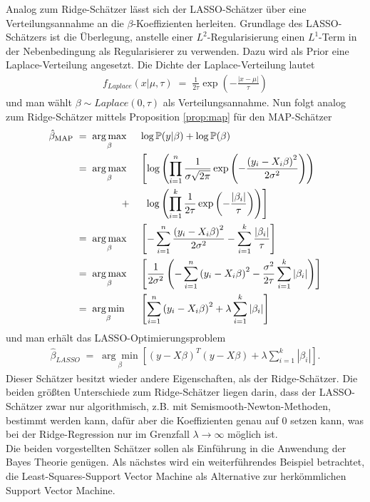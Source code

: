 Analog zum Ridge-Schätzer lässt sich der LASSO-Schätzer über eine Verteilungsannahme an die \(\beta\)-Koeffizienten herleiten. Grundlage des LASSO-Schätzers ist die Überlegung, anstelle einer \(L^2\)-Regularisierung einen \(L^1\)-Term in der Nebenbedingung als Regularisierer zu verwenden. Dazu wird als Prior eine Laplace-Verteilung angesetzt. Die Dichte der Laplace-Verteilung lautet
\begin{align*}
	f_{Laplace}(x|\mu,\tau)\;=\;\frac{1}{2\tau}\exp\left(-\frac{\left|x-\mu\right|}{\tau}\right)
\end{align*}
und man wählt \(\beta\sim Laplace(0, \tau)\) als Verteilungsannahme. Nun folgt analog zum Ridge-Schätzer mittels Proposition \autoref{prop:map} für den MAP-Schätzer
\begin{alignat*}{2}
	\hat{\beta}_{\text{MAP}}&\;=\;\underset{\beta}{\arg\max}&& \log\mathbb{P}(y\vert \beta) + \log \mathbb{P}(\beta) \\
	&\;=\;\underset{\beta}{\arg\max}&&\left[\log\left(\prod_{i=1}^{n}\frac{1}{\sigma\sqrt{2\pi}}\exp\left(-\frac{\left(y_i-X_i\beta\right)^2}{2\sigma^2}\right)\right)\right.\\	&\hspace{1,7cm}+&&\:\:\left.\log\left(\prod_{i=1}^{k}\frac{1}{2\tau}\exp\left(-\frac{\left|\beta_i\right|}{\tau}\right)\right)\right]\\
	&\;=\;\underset{\beta}{\arg\max} && \left[-\sum_{i=1}^{n}\frac{\left(y_i-X_i\beta\right)^2}{2\sigma^2}-\sum_{i=1}^{k}\frac{\left|\beta_i\right|}{\tau}\right]\\
	&\;=\;\underset{\beta}{\arg\max} && \left[\frac{1}{2\sigma^2}\left(-\sum_{i=1}^{n}\left(y_i-X_i\beta\right)^2-\frac{\sigma^2}{2\tau}\sum_{i=1}^{k}\left|\beta_i\right|\right)\right]\\
	&\;=\;\underset{\beta}{\arg\min} && \left[\sum_{i=1}^{n}\left(y_i-X_i\beta\right)^2+\lambda\sum_{i=1}^{k}\left|\beta_i\right|\right]
\end{alignat*}
und man erhält das LASSO-Optimierungsproblem
\begin{align*}
	\hat{\beta}_{LASSO}\;=\;\underset{\beta}{\arg\min}\left[\left(y-X\beta\right)^T\left(y-X\beta\right)+\lambda\sum_{i=1}^{k}\left|\beta_i\right|\right].
\end{align*}
Dieser Schätzer besitzt wieder andere Eigenschaften, als der Ridge-Schätzer. Die beiden größten Unterschiede zum Ridge-Schätzer liegen darin, dass der LASSO-Schätzer zwar nur algorithmisch, z.B. mit Semismooth-Newton-Methoden, bestimmt werden kann, dafür aber die Koeffizienten genau auf 0 setzen kann, was bei der Ridge-Regression nur im Grenzfall \(\lambda\rightarrow\infty\) möglich ist.\\[0,3cm]
Die beiden vorgestellten Schätzer sollen als Einführung in die Anwendung der Bayes Theorie genügen. Als nächstes wird ein weiterführendes Beispiel betrachtet, die Least-Squares-Support Vector Machine als Alternative zur herkömmlichen Support Vector Machine.